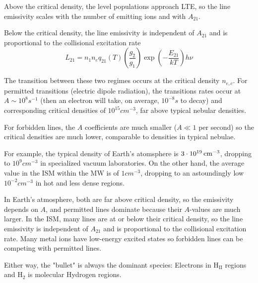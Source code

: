 Above the critical density, the level populations approach LTE, so the line emissivity scales with the number of emitting ions and with $A_{21}$.
\par Below the critical density, the line emissivity is independent of $A_{21}$ and is proportional to the collisional excitation rate
\begin{equation*}
    L_{21} = n_{1}n_{e}q_{21}(T)\left(\frac{g_{2}}{g_{1}}\right)\exp\left(-\frac{E_{21}}{kT}\right)h\nu
\end{equation*}
\par The transition between these two regimes occurs at the critical density $n_{e,c}$. For permitted transitions (electric dipole radiation), the transitions rates occur at $A\sim 10^{8}\unit{s}^{-1}$ (then an electron will take, on average, $10^{-8}\unit{s}$ to decay) and corresponding critical densities of $10^{15}\unit{cm}^{-3}$, far above typical nebular densities.
\par For forbidden lines, the $A$ coefficients are much smaller ($A \ll 1$ per second) so the critical densities are much lower, comparable to densities in typical nebulae.
\par For example, the typical density of Earth's atomsphere is $3\cdot 10^{19}\,\text{cm}^{-3}$, dropping to $10^{9}\unit{cm}^{-3}$ in specialized vacuum laboratories. On the other hand, the average value in the ISM within the MW is of $1 \unit{cm}^{-3}$, dropping to an astoundingly low $10^{-2}\unit{cm}^{-3}$ in hot and less dense regions.
\par In Earth’s atmosphere, both are far above critical density, so the emissivity depends on $A$, and permitted lines dominate because their $A$-values are much larger. In the ISM, many lines are at or below their critical density, so the line emissivity is
independent of $A_{21}$ and is proportional to the collisional excitation rate. Many metal ions have low-energy excited states so forbidden lines can be competing with permitted lines.
\par Either way, the "bullet" is always the dominant species: Electrons in H$_{\text{II}}$ regions and H$_{2}$ is molecular Hydrogen regions.
